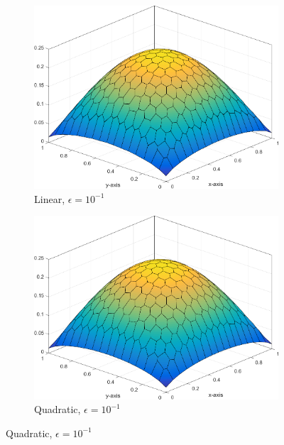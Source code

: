 \begin{figure}
\centering
{
	\begin{subfigure}[b]{0.465\textwidth}
		\centering
		\label{subfig::DL_trans_mv1_e1}
		\includegraphics[width=\textwidth]{figures/sec_BF/Sq_poly_MV_k=1_ep=1e-1.png}
		\caption{Linear, $\epsilon = 10^{-1}$}
	\end{subfigure}
	\hfill
	\begin{subfigure}[b]{0.465\textwidth}
		\centering
		\label{subfig::DL_trans_mv2_e1}
		\includegraphics[width=\textwidth]{figures/sec_BF/Sq_poly_MV_k=2_ep=1e-1.png}
		\caption{Quadratic, $\epsilon = 10^{-1}$}
	\end{subfigure}
}
{
	\vspace{3mm}
}
\end{figure}
